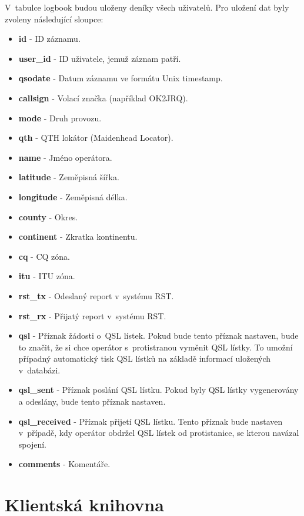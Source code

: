 V~tabulce logbook budou uloženy deníky všech uživatelů. Pro uložení dat byly
zvoleny následující sloupce:

\begin{itemize}
\item \textbf{id} - ID záznamu.
\item \textbf{user\_id} - ID uživatele, jemuž záznam patří.
\item \textbf{qsodate} - Datum záznamu ve formátu Unix timestamp.
\item \textbf{callsign} - Volací značka (například OK2JRQ).
\item \textbf{mode} - Druh provozu. %
\item \textbf{qth} - QTH lokátor (Maidenhead Locator).
\item \textbf{name} - Jméno operátora.
\item \textbf{latitude} - Zeměpisná šířka.
\item \textbf{longitude} - Zeměpisná délka.
\item \textbf{county} - Okres.
\item \textbf{continent} - Zkratka kontinentu.
\item \textbf{cq} - CQ zóna.
\item \textbf{itu} - ITU zóna.
\item \textbf{rst\_tx} - Odeslaný report v~systému RST.
\item \textbf{rst\_rx} - Přijatý report v~systému RST.
\item \textbf{qsl} - Příznak žádosti o~QSL lístek. Pokud bude tento příznak
nastaven, bude to značit, že si chce operátor
s~protistranou vyměnit QSL lístky. To umožní případný automatický tisk QSL lístků na základě informací
uložených v~databázi.
\item \textbf{qsl\_sent} - Příznak poslání QSL lístku. Pokud byly QSL lístky
vygenerovány a odeslány, bude tento
příznak nastaven.
\item \textbf{qsl\_received} - Příznak přijetí QSL lístku. Tento příznak bude
nastaven v~případě, kdy operátor
obdržel QSL lístek od protistanice, se kterou navázal spojení.
\item \textbf{comments} - Komentáře.
\end{itemize}

\section{Klientská knihovna}
\label{navrh_knihovna}

